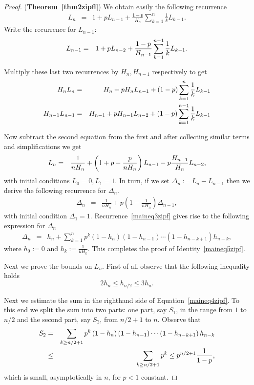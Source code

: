 \documentclass[11pt]{llncs}
\begin{document}
\begin{proof} ({\bf Theorem~\ref{thm2zipfl}})
We obtain easily the following recurrence
\begin{eqnarray}
L_n &=& \label{maineq2zipf}
1 + p L_{n-1} + \frac{1-p}{H_n} \sum_{k=1}^{n} \frac{1}{k} L_{k-1}.
\end{eqnarray}
Write the recurrence for $L_{n-1}$:
\begin{eqnarray}
L_{n-1} &=& \notag
1 + p L_{n-2} + \frac{1-p}{H_{n-1}} \sum_{k=1}^{n-1} \frac{1}{k} L_{k-1}.
\end{eqnarray}

Multiply these last two recurrences by $H_n, H_{n-1}$ respectively to get
\begin{eqnarray}
H_n L_n 
&=& \notag
H_n + p H_n L_{n-1} + (1-p) \sum_{k=1}^{n} \frac{1}{k} L_{k-1} \\
H_{n-1} L_{n-1} 
&=& \notag
H_{n-1} + p H_{n-1} L_{n-2} + (1-p) \sum_{k=1}^{n-1} \frac{1}{k} L_{k-1}
\end{eqnarray}

Now subtract the second equation from the first and after collecting
similar terms and simplifications
we get
\begin{eqnarray}
L_n 
&=& \notag
\frac{1}{nH_n} + \left( 1+p - \frac{p}{nH_n} \right) L_{n-1} 
-p \frac{H_{n-1}}{H_n} L_{n-2} ,
\end{eqnarray}
with initial conditions $L_0 =0, L_1 = 1$.
In turn, if we set $\Delta_n := L_n - L_{n-1}$ then we 
derive the following recurrence for $\Delta_n$.
\begin{eqnarray}
\Delta_n 
&=& \label{maineq3zipf}
\frac{1}{nH_n} + p \left( 1 - \frac{1}{nH_n} \right) \Delta_{n-1},
\end{eqnarray}
with initial condition $\Delta_1 =1$.
Recurrence~\eqref{maineq3zipf} gives rise
to the following expression for $\Delta_n$
\begin{eqnarray}
\Delta_n 
&=& \label{maineq4zipf}
h_n + 
\sum_{k=1}^n p^k 
\left( 1 - h_n \right)
\left( 1 - h_{n-1} \right)
\cdots
\left( 1 - h_{n-k+1} \right)
h_{n-k},
\end{eqnarray}
where $h_0 := 0$ and $h_k := \frac{1}{kH_k}$.
This completes the proof of Identity~\eqref{maineq5zipf}.

Next we prove the bounds on $L_n$. 
First of all observe that the following inequality holds
\begin{equation}
\label{hn:eq}
2 h_n \leq h_{n/2} \leq 3 h_n .
\end{equation}

Next we estimate the sum 
in the righthand side of Equation~\eqref{maineq4zipf}.
To this end we split the sum 
into two parts: one part, say $S_1$, in the range from $1$ to $n/2$ and
the second part, say $S_2$, from $n/2 +1$ to $n$.
Observe that
\begin{eqnarray}
S_2
&=& \notag
\sum_{k\geq n/2+1} p^k  \left( 1 - h_n \right) \left( 1 - h_{n-1} \right) \cdots \left( 1 - h_{n-k+1} \right) h_{n-k}\\
&\leq& \notag
\sum_{k\geq n/2+1} p^k \leq p^{n/2+1} \frac{1}{1-p} ,
\end{eqnarray}
which is small, asymptotically in $n$, for $p<1$ constant. 


\end{proof}
\end{document}

